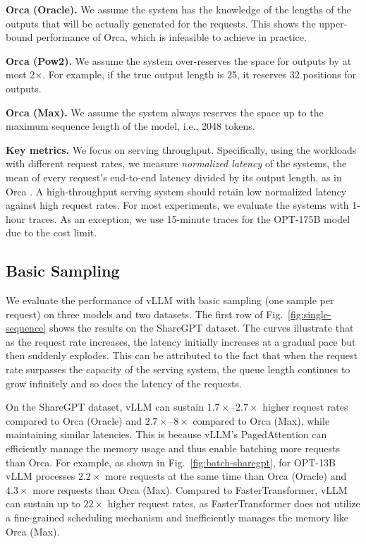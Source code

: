 \begin{CompactItemize}
    \item \textbf{Orca (Oracle).} We assume the system has the knowledge of the lengths of the outputs that will be actually generated for the requests. This shows the upper-bound performance of Orca, which is infeasible to achieve in practice.
    \item \textbf{Orca (Pow2).} We assume the system over-reserves the space for outputs by at most 2$\times$. For example, if the true output length is 25, it reserves 32 positions for outputs.
    \item \textbf{Orca (Max).} We assume the system always reserves the space up to the maximum sequence length of the model, i.e., 2048 tokens.
\end{CompactItemize}

\textbf{Key metrics.} We focus on serving throughput. Specifically, using the workloads with different request rates, we measure \textit{normalized latency} of the systems, the mean of every request's end-to-end latency divided by its output length, as in Orca \cite{yu2022orca}. A high-throughput serving system should retain low normalized latency against high request rates. For most experiments, we evaluate the systems with 1-hour traces. As an exception, we use 15-minute traces for the OPT-175B model due to the cost limit.

\subsection{Basic Sampling}
\label{sec:eval:basic-sampling}

We evaluate the performance of vLLM with basic sampling (one sample per request) on three models and two datasets. The first row of Fig.~\ref{fig:single-sequence} shows the results on the ShareGPT dataset. The curves illustrate that as the request rate increases, the latency initially increases at a gradual pace but then suddenly explodes. This can be attributed to the fact that when the request rate surpasses the capacity of the serving system, the queue length continues to grow infinitely and so does the latency of the requests.

On the ShareGPT dataset, vLLM can sustain $1.7\times$--$2.7\times$ higher request rates compared to Orca (Oracle) and $2.7\times$--$8\times$ compared to Orca (Max), while maintaining similar latencies. This is because vLLM's PagedAttention can efficiently manage the memory usage and thus enable batching more requests than Orca. For example, as shown in Fig.~\ref{fig:batch-sharegpt}, for OPT-13B vLLM processes $2.2\times$ more requests at the same time than Orca (Oracle) and $4.3\times$ more requests than Orca (Max). Compared to FasterTransformer, vLLM can sustain up to $22\times$ higher request rates, as FasterTransformer does not utilize a fine-grained scheduling mechanism and inefficiently manages the memory like Orca (Max).

